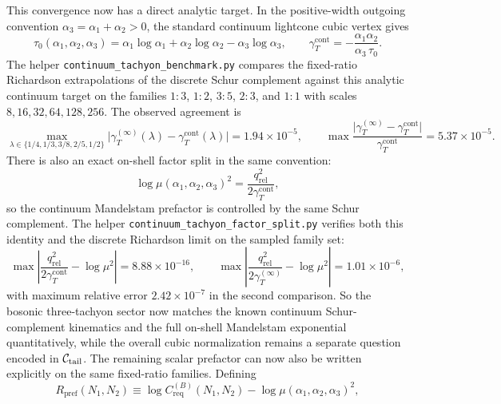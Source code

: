 \documentclass[11pt]{article}
\begin{document}
This convergence now has a direct analytic target. In the positive-width outgoing convention $\alpha_3=\alpha_1+\alpha_2>0$, the standard continuum lightcone cubic vertex gives
\begin{equation}
\tau_0(\alpha_1,\alpha_2,\alpha_3)
=
\alpha_1\log \alpha_1+\alpha_2\log \alpha_2-\alpha_3\log \alpha_3,
\qquad
\gamma_T^{\mathrm{cont}}
=
-\frac{\alpha_1\alpha_2}{\alpha_3\,\tau_0}.
\label{eq:companion-gamma-cont}
\end{equation}
The helper \texttt{continuum\_tachyon\_benchmark.py} compares the fixed-ratio Richardson extrapolations of the discrete Schur complement against this analytic continuum target on the families $1\!:\!3$, $1\!:\!2$, $3\!:\!5$, $2\!:\!3$, and $1\!:\!1$ with scales $8,16,32,64,128,256$. The observed agreement is
\begin{equation}
\max_{\lambda\in\{1/4,1/3,3/8,2/5,1/2\}}
\bigl|\gamma_T^{(\infty)}(\lambda)-\gamma_T^{\mathrm{cont}}(\lambda)\bigr|
=1.94\times 10^{-5},
\qquad
\max
\frac{\bigl|\gamma_T^{(\infty)}-\gamma_T^{\mathrm{cont}}\bigr|}{\gamma_T^{\mathrm{cont}}}
=5.37\times 10^{-5}.
\label{eq:companion-gamma-cont-error}
\end{equation}
There is also an exact on-shell factor split in the same convention:
\begin{equation}
\log \mu(\alpha_1,\alpha_2,\alpha_3)^2
=
\frac{q_{\mathrm{rel}}^2}{2\gamma_T^{\mathrm{cont}}},
\label{eq:companion-mu-split}
\end{equation}
so the continuum Mandelstam prefactor is controlled by the same Schur complement. The helper \texttt{continuum\_tachyon\_factor\_split.py} verifies both this identity and the discrete Richardson limit on the sampled family set:
\begin{equation}
\max\left|\frac{q_{\mathrm{rel}}^2}{2\gamma_T^{\mathrm{cont}}}-\log\mu^2\right|
=8.88\times 10^{-16},
\qquad
\max\left|\frac{q_{\mathrm{rel}}^2}{2\gamma_T^{(\infty)}}-\log\mu^2\right|
=1.01\times 10^{-6},
\label{eq:companion-mu-split-error}
\end{equation}
with maximum relative error $2.42\times 10^{-7}$ in the second comparison. So the bosonic three-tachyon sector now matches the known continuum Schur-complement kinematics and the full on-shell Mandelstam exponential quantitatively, while the overall cubic normalization remains a separate question encoded in ${\cal C}_{\mathrm{tail}}$.
The remaining scalar prefactor can now also be written explicitly on the same
fixed-ratio families. Defining
\begin{equation}
R_{\mathrm{pref}}(N_1,N_2)
\equiv
\log C_{\mathrm{req}}^{(B)}(N_1,N_2)-\log\mu(\alpha_1,\alpha_2,\alpha_3)^2,
\label{eq:companion-pref-remainder}
\end{equation}
\end{document}

